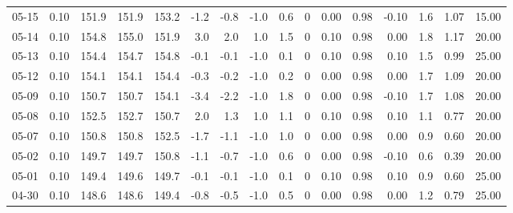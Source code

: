 \begin{threeparttable}
{\begin{tabular}{lrrrrrrrrrrrrrrr}
  05-15 &     0.10 & 151.9 & 151.9 & 153.2 &       -1.2 &           -0.8 &                     -1.0 &                 0.6 &              0 &       0.00 &      0.98 &          -0.10 &              1.6 &            1.07 &                  15.00 \\
  05-14 &     0.10 & 154.8 & 155.0 & 151.9 &        3.0 &            2.0 &                      1.0 &                 1.5 &              0 &       0.10 &      0.98 &           0.00 &              1.8 &            1.17 &                  20.00 \\
  05-13 &     0.10 & 154.4 & 154.7 & 154.8 &       -0.1 &           -0.1 &                     -1.0 &                 0.1 &              0 &       0.10 &      0.98 &           0.10 &              1.5 &            0.99 &                  25.00 \\
  05-12 &     0.10 & 154.1 & 154.1 & 154.4 &       -0.3 &           -0.2 &                     -1.0 &                 0.2 &              0 &       0.00 &      0.98 &           0.00 &              1.7 &            1.09 &                  20.00 \\
  05-09 &     0.10 & 150.7 & 150.7 & 154.1 &       -3.4 &           -2.2 &                     -1.0 &                 1.8 &              0 &       0.00 &      0.98 &          -0.10 &              1.7 &            1.08 &                  20.00 \\
  05-08 &     0.10 & 152.5 & 152.7 & 150.7 &        2.0 &            1.3 &                      1.0 &                 1.1 &              0 &       0.10 &      0.98 &           0.10 &              1.1 &            0.77 &                  20.00 \\
  05-07 &     0.10 & 150.8 & 150.8 & 152.5 &       -1.7 &           -1.1 &                     -1.0 &                 1.0 &              0 &       0.00 &      0.98 &           0.00 &              0.9 &            0.60 &                  20.00 \\
  05-02 &     0.10 & 149.7 & 149.7 & 150.8 &       -1.1 &           -0.7 &                     -1.0 &                 0.6 &              0 &       0.00 &      0.98 &          -0.10 &              0.6 &            0.39 &                  20.00 \\
  05-01 &     0.10 & 149.4 & 149.6 & 149.7 &       -0.1 &           -0.1 &                     -1.0 &                 0.1 &              0 &       0.10 &      0.98 &           0.10 &              0.9 &            0.60 &                  25.00 \\
  04-30 &     0.10 & 148.6 & 148.6 & 149.4 &       -0.8 &           -0.5 &                     -1.0 &                 0.5 &              0 &       0.00 &      0.98 &           0.00 &              1.2 &            0.79 &                  25.00 \\

\end{tabular}}
\end{threeparttable}
